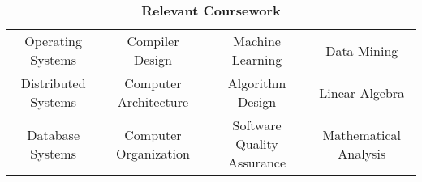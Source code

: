 \vspace*{-\baselineskip}
\begin{table}[H]
    \centering
    \caption*{\textbf{Relevant Coursework}}
    \vspace*{-\baselineskip}
    \begin{tabular}{@{}cccc@{}}
        Operating Systems   & Compiler Design       & Machine Learning           & Data Mining   \\
        Distributed Systems & Computer Architecture & Algorithm Design           & Linear Algebra\\
        Database Systems    & Computer Organization & Software Quality Assurance & Mathematical Analysis\\
    \end{tabular}
\end{table}
\vspace*{-2\baselineskip}